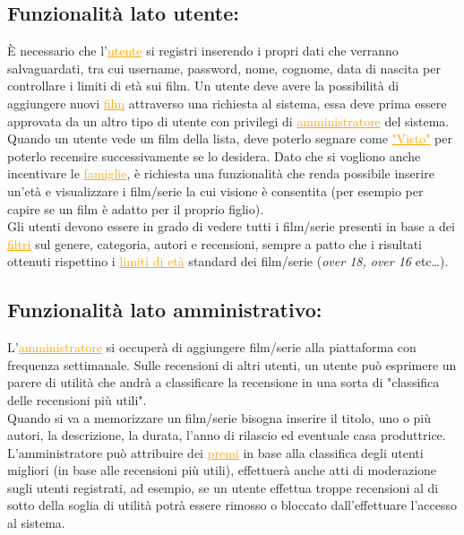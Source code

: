 \documentclass[a4paper,12pt]{report}
\begin{document}
	\subsection{Funzionalità lato utente:}
	È necessario che l'\textcolor{orange}{\underline{utente}} si registri inserendo i propri dati che verranno salvaguardati, tra cui username, password, nome, cognome, data di nascita per controllare i limiti di età sui film. Un utente deve avere la possibilità di aggiungere nuovi \textcolor{orange}{\underline{film}} attraverso una richiesta al sistema, essa deve prima essere approvata da un altro tipo di utente con privilegi di \textcolor{orange}{\underline{amministratore}} del sistema.\\
	Quando un utente vede un film della lista, deve poterlo segnare come \textcolor{orange}{\underline{"Visto"}} per poterlo recensire successivamente se lo desidera. Dato che si vogliono anche incentivare le \textcolor{orange}{\underline{famiglie}}, è richiesta una funzionalità che renda possibile inserire un'età e visualizzare i film/serie la cui visione è consentita (per esempio per capire se un film è adatto per il proprio figlio).\\
	Gli utenti devono essere in grado di vedere tutti i film/serie presenti in base a dei \textcolor{orange}{\underline{filtri}} sul genere, categoria, autori e recensioni, sempre a patto che i risultati ottenuti rispettino i \textcolor{orange}{\underline{limiti di età}} standard dei film/serie (\textit{over 18, over 16} etc\dots).
	\subsection{Funzionalità lato amministrativo:}
	L'\textcolor{orange}{\underline{amministratore}} si occuperà di aggiungere film/serie alla piattaforma con frequenza settimanale. Sulle recensioni di altri utenti, un utente può esprimere un parere di utilità che andrà a classificare la recensione in una sorta di "classifica delle recensioni più utili".\\
	Quando si va a memorizzare un film/serie bisogna inserire il titolo, uno o più autori, la descrizione, la durata, l'anno di rilascio ed eventuale casa produttrice.
	L'amministratore può attribuire dei \textcolor{orange}{\underline{premi}} in base alla classifica degli utenti migliori (in base alle recensioni più utili), effettuerà anche atti di moderazione sugli utenti registrati, ad esempio, se un utente effettua troppe recensioni al di sotto della soglia di utilità potrà essere rimosso o bloccato dall'effettuare l'accesso al sistema.
\end{document}
